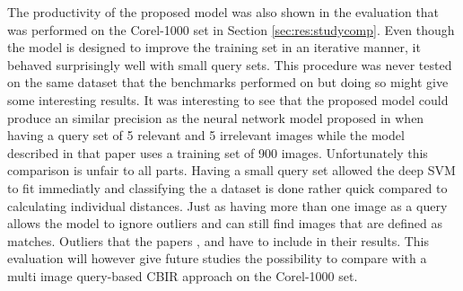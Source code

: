 The productivity of the proposed model was also shown in the evaluation that was performed on the Corel-1000 set in Section \ref{sec:res:studycomp}. Even though the model is designed to improve the training set in an iterative manner, it behaved surprisingly well with small query sets. This procedure was never tested on the same dataset that the benchmarks performed on but doing so might give some interesting results. It was interesting to see that the proposed model could produce an similar precision as the neural network model proposed in \cite{elalami2014new} when having a query set of 5 relevant and 5 irrelevant images while the model described in that paper uses a training set of 900 images. Unfortunately this comparison is unfair to all parts. Having a small query set allowed the deep SVM to fit immediatly and classifying the a dataset is done rather quick compared to calculating individual distances. Just as having more than one image as a query allows the model to ignore outliers and can still find images that are defined as matches. Outliers that the papers \cite{wang2001simplicity}, \cite{subrahmanyam2013modified} and \cite{nagaraja2015low} have to include in their results. This evaluation will however give future studies the possibility to compare with a multi image query-based CBIR approach on the Corel-1000 set.
